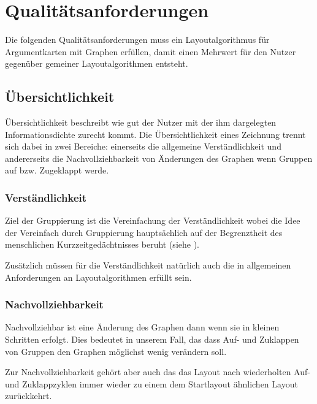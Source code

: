 \section{Qualitätsanforderungen}
Die folgenden Qualitätsanforderungen muss ein Layoutalgorithmus für Argumentkarten mit Graphen erfüllen, damit einen Mehrwert für den Nutzer gegenüber gemeiner Layoutalgorithmen entsteht.

\subsection{Übersichtlichkeit}
Übersichtlichkeit beschreibt wie gut der Nutzer mit der ihm dargelegten Informationsdichte zurecht kommt.
Die Übersichtlichkeit eines Zeichnung trennt sich dabei in zwei Bereiche: einerseits die allgemeine Verständlichkeit und andererseits die Nachvollziehbarkeit von Änderungen des Graphen wenn Gruppen auf bzw. Zugeklappt werde.

\subsubsection{Verständlichkeit}
Ziel der Gruppierung ist die Vereinfachung der Verständlichkeit wobei die Idee der Vereinfach durch Gruppierung hauptsächlich auf der Begrenztheit des menschlichen Kurzzeitgedächtnisses beruht (siehe \cite{miller1956magical, BBS:84441}).

Zusätzlich müssen für die Verständlichkeit natürlich auch die in allgemeinen Anforderungen an Layoutalgorithmen erfüllt sein.

\subsubsection{Nachvollziehbarkeit}
Nachvollziehbar ist eine Änderung des Graphen dann wenn sie in kleinen Schritten erfolgt. Dies bedeutet in unserem Fall, das dass Auf- und Zuklappen von Gruppen den Graphen möglichst wenig verändern soll.

Zur Nachvollziehbarkeit gehört aber auch das das Layout nach wiederholten Auf- und Zuklappzyklen immer wieder zu einem dem Startlayout ähnlichen Layout zurückkehrt.


